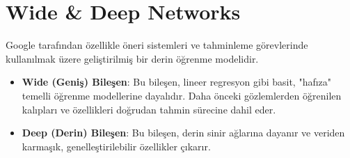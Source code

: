 \section{Wide \& Deep Networks}

Google tarafından özellikle öneri sistemleri ve tahminleme görevlerinde kullanılmak üzere geliştirilmiş bir derin öğrenme modelidir. 

\begin{itemize}
    \item \textbf{Wide (Geniş) Bileşen}: Bu bileşen, lineer regresyon gibi basit, "hafıza" temelli öğrenme modellerine dayalıdır. Daha önceki gözlemlerden öğrenilen kalıpları ve özellikleri doğrudan tahmin sürecine dahil eder.
    \item \textbf{Deep (Derin) Bileşen}: Bu bileşen, derin sinir ağlarına dayanır ve veriden karmaşık, genelleştirilebilir özellikler çıkarır.
\end{itemize}

\newpage
